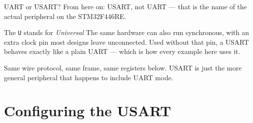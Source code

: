 \documentclass[9pt,aspectratio=169,xcolor=table]{beamer}
\begin{document}
\begin{frame}{UART or USART?}
    \leavevmode
    From here on: \alert{USART}, not UART --- that is the name of the actual
    peripheral on the STM32F446RE.

    \vspace{3mm}
    \begin{block}{The \texttt{U} stands for \emph{Universal}}
        The same hardware can also run \alert{synchronous}, with an extra clock
        pin most designs leave unconnected. Used without that pin, a USART
        behaves exactly like a plain UART --- which is how every example here
        uses it.
    \end{block}

    \vspace{2mm}
    {\small Same wire protocol, same frame, same registers below. USART is just
    the more general peripheral that happens to include UART mode.}
\end{frame}

\section{Configuring the USART}
\end{document}
